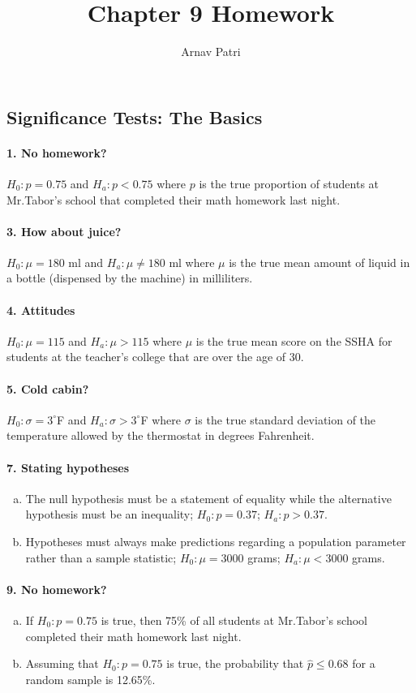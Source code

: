 \documentclass[12pt, A4]{article}
\title{Chapter 9 Homework}
\author{Arnav Patri}
\begin{document}
	\maketitle
	\setcounter{section}{9}
	\subsection{Significance Tests: The Basics}
		\paragraph{1. No homework?}
			$H_0:p = 0.75$ and $H_a:p <  0.75$ where $p$ is the true proportion of students at Mr.Tabor's school that completed their math homework last night.
		\paragraph{3. How about juice?}
			$H_0:\mu = 180$ ml and $H_a:\mu\ne 180$ ml where $\mu$ is the true mean amount of liquid in a bottle (dispensed by the machine) in milliliters.
		\paragraph{4. Attitudes}
			$H_0:\mu = 115$ and $H_a:\mu > 115$ where $\mu$ is the true mean score on the SSHA for students at the teacher's college that are over the age of 30.
		\paragraph{5. Cold cabin?}
			$H_0:\sigma = 3^\circ$F and $H_a:\sigma > 3^\circ$F where $\sigma$ is the true standard deviation of the temperature allowed by the thermostat in degrees Fahrenheit.
		\paragraph{7. Stating hypotheses}
			\begin{enumerate}[a.]
				\item
					The null hypothesis must be a statement of equality while the alternative hypothesis must be an inequality; $H_0:p = 0.37$; $H_a:p > 0.37$.
				\item
					Hypotheses must always make predictions regarding a population parameter rather than a sample statistic; $H_0:\mu = 3000$ grams; $H_a:\mu < 3000$ grams.		
			\end{enumerate}
		\paragraph{9. No homework?}
			\begin{enumerate}[a.]
				\item
					If $H_0:p = 0.75$ is true, then 75\% of all students at Mr.Tabor's school completed their math homework last night.
				\item
					Assuming that $H_0:p = 0.75$ is true, the probability that $\hat{p} \le 0.68$ for a random sample is 12.65\%.
			\end{enumerate}
\end{document}
